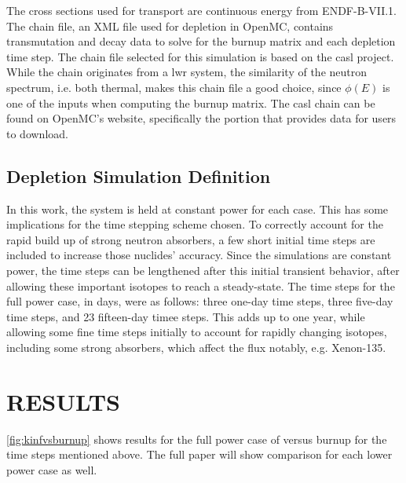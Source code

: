 \documentclass[letterpaper]{physor2024}
\begin{document}
The cross sections used for transport are continuous energy from ENDF-B-VII.1. The chain file, an XML file used for depletion in OpenMC, contains transmutation and decay data to solve for the burnup matrix and each depletion time step. The chain file selected for this simulation is based on the \gls{casl} project. While the chain originates from a \gls{lwr} system, the similarity of the neutron spectrum, i.e. both thermal, makes this chain file a good choice, since $\phi(E)$ is one of the inputs when computing the burnup matrix. The \gls{casl} chain can be found on OpenMC's website, specifically the portion that provides data for users to download.

\subsection{Depletion Simulation Definition}\label{sec:depl_sim}

In this work, the system is held at constant power for each case. This has some implications for the time stepping scheme chosen. To correctly account for the rapid build up of strong neutron absorbers, a few short initial time steps are included to increase those nuclides' accuracy. Since the simulations are constant power, the time steps can be lengthened after this initial transient behavior, after allowing these important isotopes to reach a steady-state. The time steps for the full power case, in days, were as follows: three one-day time steps, three five-day time steps, and 23 fifteen-day timee steps. This adds up to one year, while allowing some fine time steps initially to account for rapidly changing isotopes, including some strong absorbers, which affect the flux notably, e.g. Xenon-135.
\newpage

\section{RESULTS}\label{sec:results}
\cref{fig:kinfvsburnup} shows results for the full power case of \kinf versus burnup for the time steps mentioned above. The full paper will show comparison for each lower power case as well.
\end{document}
